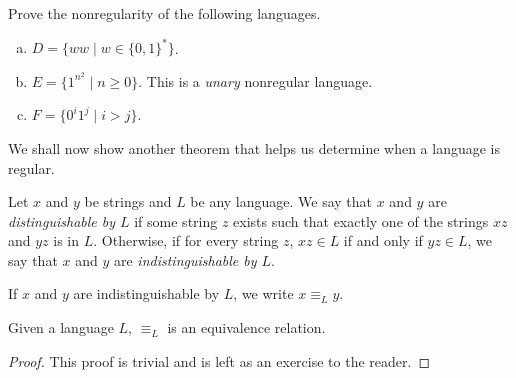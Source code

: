 \begin{exercise}
Prove the nonregularity of the following languages.
\begin{enumerate}[(a)]
    \item $D=\{ww\mid w\in\{0,1\}^*\}$.
    \item $E=\{1^{n^2}\mid n\geq 0\}$. This is a \textit{unary} nonregular language.
    \item $F=\{0^i1^j\mid i>j\}$.
\end{enumerate}
\end{exercise}

We shall now show another theorem that helps us determine when a language is regular.
\begin{definition}
Let $x$ and $y$ be strings and $L$ be any language. We say that $x$ and $y$ are \textit{distinguishable by $L$} if some string $z$ exists such that exactly one of the strings $xz$ and $yz$ is in $L$. Otherwise, if for every string $z$, $xz\in L$ if and only if $yz\in L$, we say that $x$ and $y$ are \textit{indistinguishable by $L$}.
\end{definition}

If $x$ and $y$ are indistinguishable by $L$, we write $x\equiv_Ly$.
\begin{lemma}
Given a language $L$, $\equiv_L$ is an equivalence relation.
\end{lemma}
\begin{proof}
This proof is trivial and is left as an exercise to the reader.
\end{proof}

